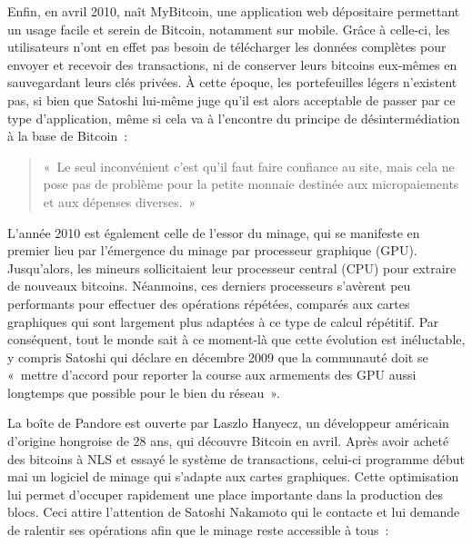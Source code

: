 Enfin, en avril 2010, naît MyBitcoin, une application web dépositaire permettant un usage facile et serein de Bitcoin, notamment sur mobile. Grâce à celle-ci, les utilisateurs n'ont en effet pas besoin de télécharger les données complètes pour envoyer et recevoir des transactions, ni de conserver leurs bitcoins eux-mêmes en sauvegardant leurs clés privées. À cette époque, les portefeuilles légers n'existent pas, si bien que Satoshi lui-même juge qu'il est alors acceptable de passer par ce type d'application, même si cela va à l'encontre du principe de désintermédiation à la base de Bitcoin~:

\begin{quote}
«~Le seul inconvénient c'est qu'il faut faire confiance au site, mais cela ne pose pas de problème pour la petite monnaie destinée aux micropaiements et aux dépenses diverses.~»
\end{quote}


L'année 2010 est également celle de l'essor du minage, qui se manifeste en premier lieu par l'émergence du minage par processeur graphique (GPU). Jusqu'alors, les mineurs sollicitaient leur processeur central (CPU) pour extraire de nouveaux bitcoins. Néanmoins, ces derniers processeurs s'avèrent peu performants pour effectuer des opérations répétées, comparés aux cartes graphiques qui sont largement plus adaptées à ce type de calcul répétitif. Par conséquent, tout le monde sait à ce moment-là que cette évolution est inéluctable, y compris Satoshi qui déclare en décembre 2009 que la communauté doit se «~mettre d'accord pour reporter la course aux armements des GPU aussi longtemps que possible pour le bien du réseau~».

La boîte de Pandore est ouverte par Laszlo Hanyecz, un développeur américain d'origine hongroise de 28 ans, qui découvre Bitcoin en avril. Après avoir acheté des bitcoins à NLS et essayé le système de transactions, celui-ci programme début mai un logiciel de minage qui s'adapte aux cartes graphiques. Cette optimisation lui permet d'occuper rapidement une place importante dans la production des blocs. Ceci attire l'attention de Satoshi Nakamoto qui le contacte et lui demande de ralentir ses opérations afin que le minage reste accessible à tous~:

